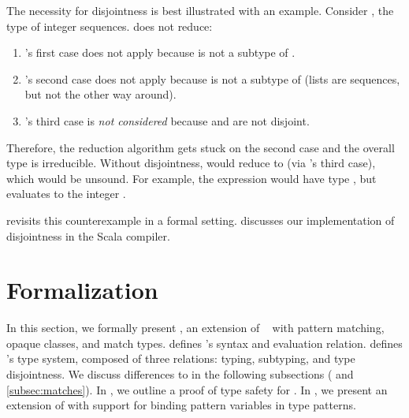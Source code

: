 The necessity for disjointness is best illustrated with an example. Consider , the type of integer sequences.  does not reduce:
\begin{enumerate}
  \item {}'s first case does not apply because  is not a subtype of .
  \item {}'s second case does not apply because  is not a subtype of  (lists are sequences, but not the other way around).
  \item {}'s third case is \emph{not considered} because  and  are not disjoint.
\end{enumerate}
Therefore, the reduction algorithm gets stuck on the second case and the overall type is irreducible.
Without disjointness,  would reduce to  (via 's third case), which would be unsound. For example, the expression  would have type , but evaluates to the integer .

 revisits this counterexample in a formal setting.  discusses our implementation of disjointness in the Scala compiler.



\section{Formalization}
\label{sec:formalization}

In this section, we formally present \SystemFm, an extension of \SystemFsub~\citep{cardelli1994extension} with pattern matching, opaque classes, and match types.
 defines \Fm's syntax and evaluation relation.  defines \Fm's type system, composed of three relations: typing, subtyping, and type disjointness.
We discuss differences to \SystemFsub in the following subsections ( and \ref{subsec:matches}).
In , we outline a proof of type safety for \SystemFm.
In , we present an extension of \SystemFm with support for binding pattern variables in type patterns.

